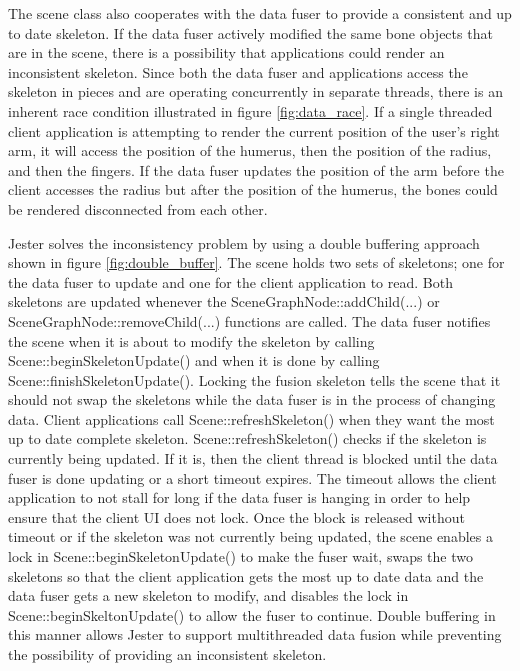 The scene class also cooperates with the data fuser to provide a consistent and up to date skeleton. If the data fuser actively modified the same bone objects that are in the scene, there is a possibility that applications could render an inconsistent skeleton. Since both the data fuser and applications access the skeleton in pieces and are operating concurrently in separate threads, there is an inherent race condition illustrated in figure \ref{fig:data_race}. If a single threaded client application is attempting to render the current position of the user’s right arm, it will access the position of the humerus, then the position of the radius, and then the fingers. If the data fuser updates the position of the arm before the client accesses the radius but after the position of the humerus, the bones could be rendered disconnected from each other.

Jester solves the inconsistency problem by using a double buffering approach shown in figure \ref{fig:double_buffer}. The scene holds two sets of skeletons; one for the data fuser to update and one for the client application to read. Both skeletons are updated whenever the SceneGraphNode::addChild(...) or SceneGraphNode::removeChild(...) functions are called. The data fuser notifies the scene when it is about to modify the skeleton by calling Scene::beginSkeletonUpdate() and when it is done by calling Scene::finishSkeletonUpdate(). Locking the fusion skeleton tells the scene that it should not swap the skeletons while the data fuser is in the process of changing data. Client applications call Scene::refreshSkeleton() when they want the most up to date complete skeleton. Scene::refreshSkeleton() checks if the skeleton is currently being updated. If it is, then the client thread is blocked until the data fuser is done updating or a short timeout expires. The timeout allows the client application to not stall for long if the data fuser is hanging in order to help ensure that the client UI does not lock. Once the block is released without timeout or if the skeleton was not currently being updated, the scene enables a lock in Scene::beginSkeletonUpdate() to make the fuser wait, swaps the two skeletons so that the client application gets the most up to date data and the data fuser gets a new skeleton to modify, and disables the lock in Scene::beginSkeltonUpdate() to allow the fuser to continue. Double buffering in this manner allows Jester to support multithreaded data fusion while preventing the possibility of providing an inconsistent skeleton.

